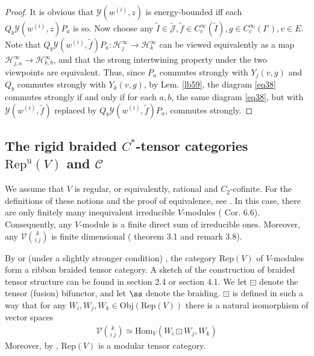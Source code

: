 \documentclass[11pt,b5paper,notitlepage]{article}
\theoremstyle{definition}
\theoremstyle{plain}
\newcommand{\mc}{\mathcal}
\newcommand{\wtd}{\widetilde}
\newcommand{\Hom}{\mathrm{Hom}}
\newcommand{\Rep}{\mathrm{Rep}}
\newcommand{\scr}{\mathscr}
\newcommand{\Jtd}{\widetilde{\mathcal J}}
\newcommand{\RepuV}{\mathrm{Rep}^{\mathrm u}(V)}
\newcommand{\Obj}{\mathrm{Obj}}
\numberwithin{equation}{subsection}
\begin{document}
\begin{proof}
It is obvious that $\mc Y(w^{(i)},z)$ is energy-bounded iff each $Q_b\mc Y(w^{(i)},z) P_a$ is so. Now choose any $\wtd I\in\Jtd,\wtd f\in C_c^\infty(\wtd I),g\in C_c^\infty(I'),v\in E$. Note that $Q_b\mc Y(w^{(i)},\wtd f)P_a:\mc H_j^\infty\rightarrow\mc H_k^\infty$ can be viewed equivalently as a map $\mc H_{j,a}^\infty\rightarrow\mc H_{k,b}^\infty$, and that the strong intertwining property under the two viewpoints are equivalent. Thus, since $P_a$ commutes strongly with $Y_j(v,g)$ and $Q_b$ commutes strongly with $Y_k(v,g)$, by Lem. \ref{lb59}, the diagram \eqref{eq38} commutes strongly if and only if for each $a,b$, the same diagram \eqref{eq38}, but with $\mc Y(w^{(i)},\wtd f)$ replaced by $Q_b\mc Y(w^{(i)},\wtd f)P_a$, commutes strongly.
\end{proof}







\subsection{The rigid braided $C^*$-tensor categories $\RepuV$ and $\scr C$}\label{lb87}


We assume that $V$ is regular, or equivalently, rational and $C_2$-cofinite. For the definitions of these notions and the proof of equivalence, see \cite{ABD04}. In this case, there are only finitely many inequivalent irreducible $V$-modules (\cite{Hua05b} Cor. 6.6). Consequently, any $V$-module is a finite direct sum of irreducible ones. Moreover, any $\mc V{k\choose i~j}$ is finite dimensional (\cite{Hua05a} theorem 3.1 and remark 3.8). 

By \cite{HL95a,HL95b,HL95c,Hua95,Hua05a} or (under a slightly stronger condition) \cite{NT05}, the category $\Rep(V)$ of  $V$-modules form a  ribbon braided tensor category. A sketch of the construction of braided tensor structure can be found in \cite{Gui19a} section 2.4 or \cite{Gui21a} section 4.1.  We let $\boxdot$ denote the tensor (fusion) bifunctor, and let $\ss$ denote the braiding. $\boxdot$ is defined in such a way that for any $W_i,W_j,W_k\in\Obj(\Rep(V))$ there is a natural isomorphism of vector spaces
\begin{align}
\mc V{k\choose i~j}\simeq\Hom_V(W_i\boxdot W_j,W_k)\label{eq47}
\end{align}
Moreover, by \cite{Hua05b,Hua08a,Hua08b}, $\Rep(V)$ is a modular tensor category. 
\end{document}
